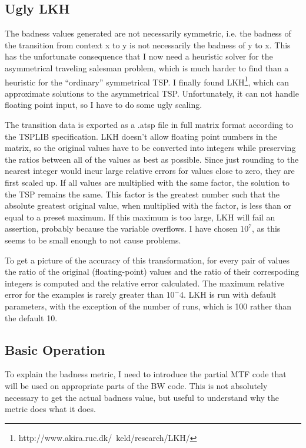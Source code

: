 \documentclass[a4paper]{scrreprt}
\begin{document}
\subsection{Ugly LKH}

The badness values generated are not necessarily symmetric, i.e. the badness of
the transition from context x to y is not necessarily the badness of y to x.
This has the unfortunate consequence that I now need a heuristic solver for the
asymmetrical traveling salesman problem, which is much harder to find than a
heuristic for the ``ordinary'' symmetrical TSP. I finally found
LKH\cite{helsgaun2000lkh}\footnote{http://www.akira.ruc.dk/~keld/research/LKH/},
which can approximate solutions to the asymmetrical TSP. Unfortunately, it can
not handle floating point input, so I have to do some ugly scaling.

The transition data is exported as a .atsp file in full matrix format according
to the TSPLIB specification\cite{reinelt1991tsplib}. LKH doesn't allow floating
point numbers in the matrix, so the original values have to be converted into
integers while preserving the ratios between all of the values as best as
possible. Since just rounding to the nearest integer would incur large relative
errors for values close to zero, they are first scaled up. If all values are
multiplied with the same factor, the solution to the TSP remains the same. This
factor is the greatest number such that the absolute greatest original value,
when multiplied with the factor, is less than or equal to a preset maximum. If
this maximum is too large, LKH will fail an assertion, probably because the
variable overflows. I have chosen \(10^7\), as this seems to be small
enough to not cause problems.

To get a picture of the accuracy of this transformation, for every pair of
values the ratio of the original (floating-point) values and the ratio of their
correspoding integers is computed and the relative error calculated. The maximum
relative error for the examples is rarely greater than \(10^-4\).
LKH is run with default parameters, with the exception of the number of runs,
which is 100 rather than the default 10.

\subsection{Basic Operation}

To explain the badness metric, I need to introduce the partial MTF code that
will be used on appropriate parts of the BW code. This is not absolutely
necessary to get the actual badness value, but useful to understand why the
metric does what it does.
\end{document}
